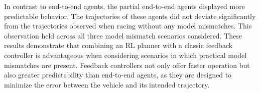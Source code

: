 In contrast to end-to-end agents, the partial end-to-end agents displayed more predictable behavior.
The trajectories of these agents did not deviate significantly from the trajectories observed when racing without any model mismatches.
This observation held across all three model mismatch scenarios considered.
These results demonstrate that combining an RL planner with a classic feedback controller is advantageous when considering scenarios in which practical model mismatches are present.
Feedback controllers not only offer faster operation but also greater predictability than end-to-end agents, as they are designed to minimize the error between the vehicle and its intended trajectory.